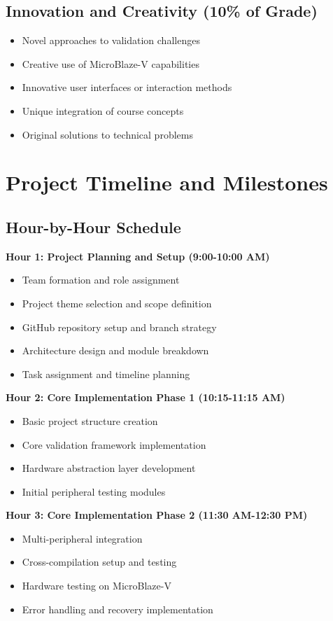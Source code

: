 \documentclass[11pt,a4paper]{article}
\begin{document}
\subsection{Innovation and Creativity (10\% of Grade)}
\begin{itemize}
    \item Novel approaches to validation challenges
    \item Creative use of MicroBlaze-V capabilities
    \item Innovative user interfaces or interaction methods
    \item Unique integration of course concepts
    \item Original solutions to technical problems
\end{itemize}

\section{Project Timeline and Milestones}

\subsection{Hour-by-Hour Schedule}

\textbf{Hour 1: Project Planning and Setup (9:00-10:00 AM)}
\begin{itemize}
    \item Team formation and role assignment
    \item Project theme selection and scope definition
    \item GitHub repository setup and branch strategy
    \item Architecture design and module breakdown
    \item Task assignment and timeline planning
\end{itemize}

\textbf{Hour 2: Core Implementation Phase 1 (10:15-11:15 AM)}
\begin{itemize}
    \item Basic project structure creation
    \item Core validation framework implementation
    \item Hardware abstraction layer development
    \item Initial peripheral testing modules
\end{itemize}

\textbf{Hour 3: Core Implementation Phase 2 (11:30 AM-12:30 PM)}
\begin{itemize}
    \item Multi-peripheral integration
    \item Cross-compilation setup and testing
    \item Hardware testing on MicroBlaze-V
    \item Error handling and recovery implementation
\end{itemize}
\end{document}
